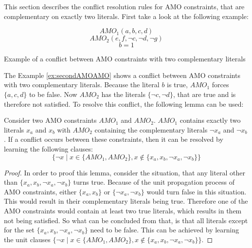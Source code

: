 This section describes the conflict resolution rules for AMO constraints, that are complementary on exactly two literals. First take a look at the following example:
\begin{example}[H]
\begin{leftbar}
\begin{displaymath}
AMO_1(a,b,c,d)
\end{displaymath}
\begin{displaymath}
AMO_2(e,f,\neg c,\neg d, \neg g)
\end{displaymath}
\begin{displaymath}
b = 1
\end{displaymath}
\end{leftbar}
\caption{Example of a conflict between AMO constraints with two complementary literals}
\label{ex:secondAMOAMO}
\end{example}
The Example \ref{ex:secondAMOAMO} shows a conflict between AMO constraints with two complementary literals. Because the literal $b$ is true, $AMO_1$ forces $\{a,c,d\}$ to be false. Now $AMO_2$ has the literals $\{\neg c,\neg d\}$, that are true and is therefore not satisfied. To resolve this conflict, the following lemma can be used:

\begin{lemma}
\begin{leftbar}
Consider two AMO constraints $AMO_1$ and $AMO_2$. $AMO_1$ contains exactly two literals $x_a$ and $x_b$ with $AMO_2$ containing the complementary literals $\neg x_a$ and $\neg x_b$.
If a conflict occurs between these constraints, then it can be resolved by learning the following clauses:
\begin{displaymath}
\{\neg x \; | \; x \in \{AMO_1,AMO_2\}, x \notin \{x_a,x_b,\neg x_a, \neg x_b\}\}
\end{displaymath}
\end{leftbar}
\label{le:twoComplementary}
\end{lemma}

\begin{proof}
In order to proof this lemma, consider the situation, that any literal other than \newline $\{x_a, x_b, \neg x_a, \neg x_b\}$ turns true. Because of the unit propagation process of AMO constraints, either $\{x_a, x_b\}$ or $\{\neg x_a, \neg x_b\}$ would turn false in this situation. This would result in their complementary literals being true. Therefore one of the AMO constraints would contain at least two true literals, which results in them not being satisfied. So what can be concluded from that, is that all literals except for the set $\{x_a, x_b, \neg x_a, \neg x_b\}$ need to be false. This can be achieved by learning the unit clauses $\{\neg x \; | \; x \in \{AMO_1,AMO_2\}, x \notin \{x_a,x_b, \neg x_a, \neg x_b\}\}$.
\end{proof}

